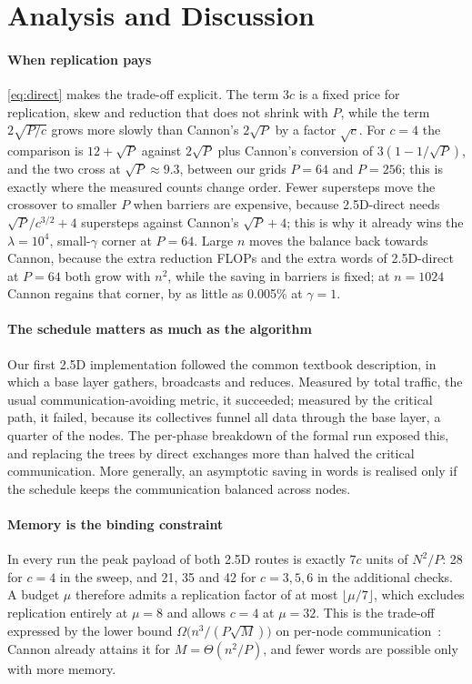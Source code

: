 \documentclass[11pt,a4paper]{article}
\begin{document}
\section{Analysis and Discussion}
\label{sec:discussion}

\paragraph{When replication pays}
\cref{eq:direct} makes the trade-off explicit. The term $3c$ is a fixed price for replication, skew and
reduction that does not shrink with $P$, while the term $2\sqrt{P/c}$ grows more slowly than Cannon's
$2\sqrt P$ by a factor $\sqrt c$. For $c=4$ the comparison is $12+\sqrt P$ against $2\sqrt P$ plus
Cannon's conversion of $3(1-1/\sqrt P)$, and the two cross at $\sqrt P\approx9.3$, between our grids
$P=64$ and $P=256$; this is exactly where the measured counts change order. Fewer supersteps move the
crossover to smaller $P$ when barriers are expensive, because 2.5D-direct needs $\sqrt{P}/c^{3/2}+4$
supersteps against Cannon's $\sqrt P+4$; this is why it already wins the $\lambda=10^4$, small-$\gamma$
corner at $P=64$. Large $n$ moves the balance back towards Cannon, because the extra reduction FLOPs and
the extra words of 2.5D-direct at $P=64$ both grow with $n^2$, while the saving in barriers is fixed; at
$n=1024$ Cannon regains that corner, by as little as 0.005\% at $\gamma=1$.

\paragraph{The schedule matters as much as the algorithm}
Our first 2.5D implementation followed the common textbook description, in which a base layer gathers,
broadcasts and reduces. Measured by total traffic, the usual communication-avoiding metric, it succeeded;
measured by the critical path, it failed, because its collectives funnel all data through the base layer,
a quarter of the nodes. The per-phase breakdown of the formal run exposed this, and replacing the trees by
direct exchanges more than halved the critical communication. More generally, an asymptotic saving in
words is realised only if the schedule keeps the communication balanced across nodes.

\paragraph{Memory is the binding constraint}
In every run the peak payload of both 2.5D routes is exactly $7c$ units of $N^2/P$: 28 for $c=4$ in the
sweep, and 21, 35 and 42 for $c=3,5,6$ in the additional checks. A budget $\mu$ therefore admits a
replication factor of at most $\lfloor\mu/7\rfloor$, which excludes replication entirely at $\mu=8$ and
allows $c=4$ at $\mu=32$. This is the trade-off expressed by the lower bound
$\Omega\big(n^3/(P\sqrt M)\big)$ on per-node communication~\cite{ballard2011,ballard2014}: Cannon already
attains it for $M=\Theta(n^2/P)$, and fewer words are possible only with more memory.
\end{document}
